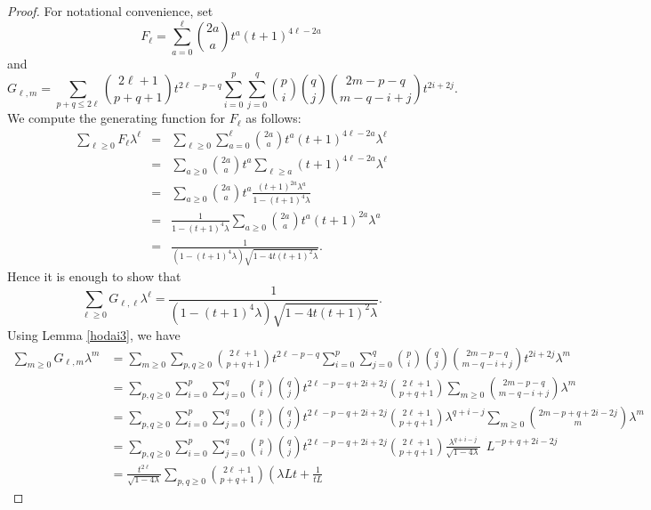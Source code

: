 \documentclass[10pt,a4paper]{amsart}
\begin{document}
\begin{proof}
For notational convenience, set 
\[
F_\ell = \sum_{a=0}^\ell \binom{2a}{a} t^a (t+1)^{4\ell -2a}
\]
and
\[
G_{\ell,m} = 
\sum_{p+q \le 2 \ell} \binom{2 \ell +1}{p+q+1}
t^{2\ell -p-q} \sum_{i=0}^p \sum_{j=0}^q  \binom{p}{i} \binom{q}{j}
\binom{2m -p-q}{m -q-i+j} t^{2i + 2j}.\]
We compute the generating function for $F_{\ell}$ as follows:
\begin{eqnarray*}
\sum_{\ell \ge 0}  F_\ell  \lambda^\ell
&=&\sum_{\ell \ge 0} 
\sum_{a=0}^\ell \binom{2a}{a} t^a (t+1)^{4\ell -2a}
\lambda^\ell\\
&=&
\sum_{a\ge 0} 
\binom{2a}{a} t^a 
\sum_{\ell \ge a} 
(t+1)^{4\ell -2a} 
\lambda^\ell\\
&=&
\sum_{a\ge 0} 
\binom{2a}{a} t^a 
\frac{(t+1)^{2a} \lambda^a}{
1- (t+1)^4 \lambda
}\\
&=&
\frac{1}{
1- (t+1)^4 \lambda
}\sum_{a\ge 0} 
\binom{2a}{a} t^a 
(t+1)^{2a} \lambda^a\\
&=&
\frac{1}{
(1- (t+1)^4 \lambda)\sqrt{
1-4 t (t+1)^2 \lambda
}}.
\end{eqnarray*}
Hence it is enough to show that
\[
\sum_{\ell \ge 0} G_{\ell,\ell} \lambda^\ell
=\frac{1}{
(1- (t+1)^4 \lambda)\sqrt{
1-4 t (t+1)^2 \lambda
}}.
\]
Using Lemma \ref{hodai3}, we have
\[\begin{aligned}
\sum_{m \ge 0} G_{\ell, m} \lambda^m
&=
\sum_{m \ge 0}
\sum_{p, q \ge 0}
\binom{2 \ell +1}{p+q+1}
t^{2\ell -p-q} \sum_{i=0}^p \sum_{j=0}^q  \binom{p}{i} \binom{q}{j}
\binom{2 m -p-q}{m -q-i+j} t^{2i + 2j}
\lambda^m\\
&=
\sum_{p,q \ge 0}
\sum_{i=0}^p \sum_{j=0}^q  
\binom{p}{i} \binom{q}{j}
t^{2\ell -p-q + 2i + 2j}
%
\binom{2 \ell +1}{p+q+1}
%
\sum_{m \ge 0}
\binom{2m -p-q}{m -q-i+j} 
\lambda^m
\\
&=
\sum_{p,q \ge 0}
\sum_{i=0}^p \sum_{j=0}^q  
\binom{p}{i} \binom{q}{j}
t^{2\ell -p-q + 2i + 2j}
%
\binom{2 \ell +1}{p+q+1}
\lambda^{q + i -j}
%
\sum_{m \ge 0}
\binom{2m -p +q + 2i -2j}{m} 
\lambda^{m}
\\
&=
\sum_{p,q \ge 0}
\sum_{i=0}^p \sum_{j=0}^q  
\binom{p}{i} \binom{q}{j}
t^{2\ell -p-q + 2i + 2j}
%
\binom{2 \ell +1}{p+q+1}
%
\frac{ \lambda^{q + i -j}}{\sqrt{1 - 4 \lambda}}
\ \ L^{-p +q + 2i -2j}
\\
&=
\frac{t^{2\ell}}{\sqrt{1 - 4 \lambda}}
\sum_{p,q \ge 0}
\binom{2 \ell +1}{p+q+1}
\left(
\lambda L t + \frac{1}{tL}

\end{aligned}\]
\end{proof}
\end{document}
